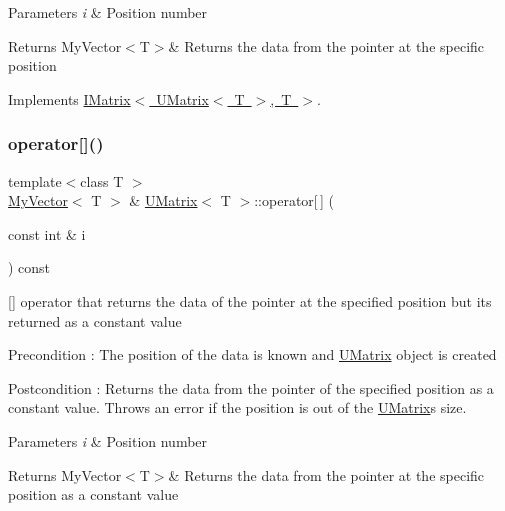 \begin{DoxyParams}{Parameters}
{\em i} & Position number \\
\hline
\end{DoxyParams}
\begin{DoxyReturn}{Returns}
My\+Vector$<$\+T$>$\& Returns the data from the pointer at the specific position 
\end{DoxyReturn}


Implements \mbox{\hyperlink{class_i_matrix_a3cfb2490e2849c6c19c1979066a64818}{I\+Matrix$<$ U\+Matrix$<$ T $>$, T $>$}}.

\mbox{\label{class_u_matrix_ab0ad5eda96c9a8bb9ca8c69d4bb8d5f8}} 
\subsubsection{\texorpdfstring{operator[]()}{operator[]()}\hspace{0.1cm}{\footnotesize\ttfamily [2/2]}}
{\footnotesize\ttfamily template$<$class T $>$ \\
\mbox{\hyperlink{class_my_vector}{My\+Vector}}$<$ T $>$ \& \mbox{\hyperlink{class_u_matrix}{U\+Matrix}}$<$ T $>$\+::operator\mbox{[}$\,$\mbox{]} (\begin{DoxyParamCaption}\item[{const int \&}]{i }\end{DoxyParamCaption}) const\hspace{0.3cm}{\ttfamily [virtual]}}



\mbox{[}\mbox{]} operator that returns the data of the pointer at the specified position but its returned as a constant value 

\begin{DoxyPrecond}{Precondition}
\+: The position of the data is known and \mbox{\hyperlink{class_u_matrix}{U\+Matrix}} object is created 
\end{DoxyPrecond}
\begin{DoxyPostcond}{Postcondition}
\+: Returns the data from the pointer of the specified position as a constant value. Throws an error if the position is out of the \mbox{\hyperlink{class_u_matrix}{U\+Matrix}}\textquotesingle{}s size. 
\end{DoxyPostcond}

\begin{DoxyParams}{Parameters}
{\em i} & Position number \\
\hline
\end{DoxyParams}
\begin{DoxyReturn}{Returns}
My\+Vector$<$\+T$>$\& Returns the data from the pointer at the specific position as a constant value 
\end{DoxyReturn}


